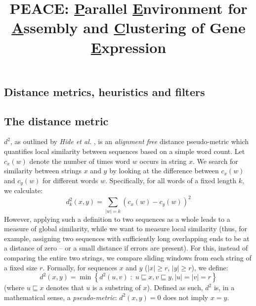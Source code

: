 \documentclass[a4paper,12pt]{article}
\begin{document}
\title{PEACE: {\underline P}arallel {\underline E}nvironment for {\underline A}ssembly
  and {\underline C}lustering of Gene {\underline E}xpression}

\date{}

\maketitle  

\begin{appendix}

\renewcommand{\theequation}{S\arabic{equation}}
\renewcommand{\thefigure}{S\arabic{figure}}
\renewcommand{\thetable}{S\arabic{table}}
\setcounter{equation}{0}

\section{Distance metrics, heuristics and filters}

\subsection{The distance metric}
$d^2$, as outlined by {\it Hide et al.} \cite{Hide94}, is an {\it
  alignment free} distance pseudo-metric which quantifies local
similarity between sequences based on a simple word count.  Let
$c_x(w)$ denote the number of times word $w$ occurs in string $x$.  We
search for similarity between strings $x$ and $y$ by looking at the
difference between $c_x(w)$ and $c_y(w)$ for different words $w$.
Specifically,  for all words of a fixed length $k$, we calculate:
\begin{equation*}
d^2_k(x,y) = \sum_{|w|=k}(c_x(w) - c_y(w))^2
\end{equation*}
However, applying such a definition to two sequences as a whole leads
to a measure of global similarity, while we want to measure local
similarity (thus, for example, assigning two sequences with
sufficiently long overlapping ends to be at a distance of zero -- or a
small distance if errors are present).  For this, instead of comparing
the entire two strings, we compare sliding windows from each string of a fixed
size $r$.  Formally, for sequences $x$ and $y$ ($|x| \geq r$, $|y|
\geq r$), we define:
\begin{equation}
\label{d2def}
d^2(x,y) = 
\min\left\{d^2(u,v) \; : \; u \sqsubseteq x, v \sqsubseteq y, |u|=|v|=r\right\}
\end{equation}
(where $u \sqsubseteq x$ denotes that $u$ is a substring of $x$).
Defined as such, $d^2$ is, in a mathematical sense, a {\it
  pseudo-metric}: $d^2(x,y) = 0$ does not imply $x=y$.


\end{appendix}
\end{document}
